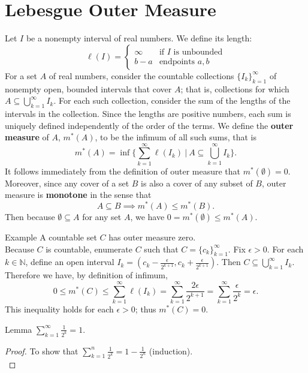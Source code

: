 \section{Lebesgue Outer Measure}
\begin{flushleft}

Let $I$ be a nonempty interval of real numbers. We define its length:
\[
	\ell(I)=
	\begin{cases}
		\infty&\text{if $I$ is unbounded}\\
		b-a&\text{endpoints $a,b$}
	\end{cases}	
\]
For a set $A$ of real numbers, consider the countable collections $\{I_k\}_{k=1}^\infty$ of nonempty open, bounded intervals that cover $A$; that is, collections for which $A\subseteq\bigcup_{k=1}^\infty I_k$.
For each such collection, consider the sum of the lengths of the intervals in the collection. Since the lengths are positive numbers, each sum is uniquely defined independently of the order of the terms.
We define the \textbf{outer measure} of $A$, $m^*(A)$, to be the infimum of all such sums, that is
\[
	m^*(A)=\inf\biggl\{\sum_{k=1}^\infty\ell(I_k)\ \biggl|\ A\subseteq\bigcup_{k=1}^\infty I_k\biggr\}.
\]
It follows immediately from the definition of outer measure that $m^*(\emptyset)=0$.
Moreover, since any cover of a set $B$ is also a cover of any subset of $B$, outer measure is \textbf{monotone} in the sense that
\[
	A\subseteq B\implies m^*(A)\le m^*(B).	
\]
Then because $\emptyset\subseteq A$ for any set $A$, we have $0=m^*(\emptyset)\le m^*(A)$.
\begin{namedthm*}{Example}
	A countable set $C$ has outer measure zero.\\
	Because $C$ is countable, enumerate $C$ such that $C=\{c_k\}_{k=1}^\infty$.
	Fix $\epsilon>0$. 
	For each $k\in\mathbb{N}$, define an open interval $I_k= (c_k-\frac{\epsilon}{2^{k+1}},c_k+\frac{\epsilon}{2^{k+1}})$.
	Then $C\subseteq\bigcup_{k=1}^\infty I_k$.
	Therefore we have, by definition of infimum,
	\[
	0\le m^*(C)\le\sum_{k=1}^\infty\ell(I_k)=\sum_{k=1}^\infty\frac{2\epsilon}{2^{k+1}} = \sum_{k=1}^\infty\frac{\epsilon}{2^k}=\epsilon.
	\]
	This inequality holds for each $\epsilon>0$; thus $m^*(C)=0$.
\end{namedthm*}
\begin{namedthm*}{Lemma}
	$\sum_{k=1}^\infty\frac{1}{2^k}=1$.
\end{namedthm*}
\begin{proof}
	To show that $\sum_{k=1}^n\frac{1}{2^k}=1-\frac{1}{2^n}$ (induction).\\

\end{proof}
\end{flushleft}
